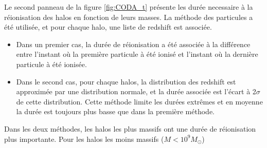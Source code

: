 Le second panneau de la figure \ref{fig:CODA_t} présente les durée necessaire à la réionisation des halos en fonction de leurs masses.
La méthode des particules a été utilisée, et pour chaque halo, une liste de redshift est associée.
\begin{itemize}
\item Dans un premier cas, la durée de réionisation a été associée à la différence entre l'instant où la première particule à été ionisé et l'instant où la dernière particule à été ionisée.
\item Dans le second cas, pour chaque halos, la distribution des redshift est approximée par une distribution normale, et la durée associée est l'écart à 2$\sigma$ de cette distribution.
Cette méthode limite les durées extrêmes et en moyenne la durée est toujours plus basse que dans la première méthode.
\end{itemize}

Dans les deux méthodes, les halos les plus massifs ont une durée de réionisation plus importante. 
Pour les halos les moins massifs ($M<10^9 M_\odot$)

